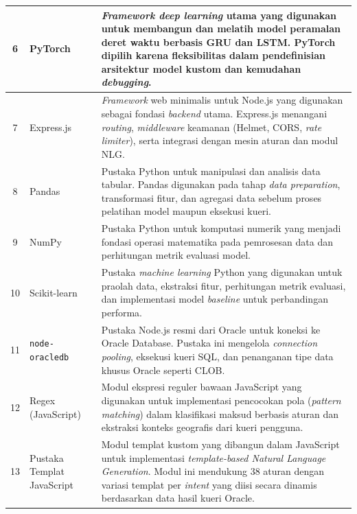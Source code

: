 \begin{longtable}{|c|p{2.5cm}|p{9cm}|}
6 & PyTorch & \textit{Framework deep learning} utama yang digunakan untuk membangun dan melatih model peramalan deret waktu berbasis GRU dan LSTM. PyTorch dipilih karena fleksibilitas dalam pendefinisian arsitektur model kustom dan kemudahan \textit{debugging}. \\
\hline

7 & Express.js & \textit{Framework} web minimalis untuk Node.js yang digunakan sebagai fondasi \textit{backend} utama. Express.js menangani \textit{routing}, \textit{middleware} keamanan (Helmet, CORS, \textit{rate limiter}), serta integrasi dengan mesin aturan dan modul NLG. \\
\hline

8 & Pandas & Pustaka Python untuk manipulasi dan analisis data tabular. Pandas digunakan pada tahap \textit{data preparation}, transformasi fitur, dan agregasi data sebelum proses pelatihan model maupun eksekusi kueri. \\
\hline

9 & NumPy & Pustaka Python untuk komputasi numerik yang menjadi fondasi operasi matematika pada pemrosesan data dan perhitungan metrik evaluasi model. \\
\hline

10 & Scikit-learn & Pustaka \textit{machine learning} Python yang digunakan untuk praolah data, ekstraksi fitur, perhitungan metrik evaluasi, dan implementasi model \textit{baseline} untuk perbandingan performa. \\
\hline

11 & \texttt{node-}\newline\texttt{oracledb} & Pustaka Node.js resmi dari Oracle untuk koneksi ke Oracle Database. Pustaka ini mengelola \textit{connection pooling}, eksekusi kueri SQL, dan penanganan tipe data khusus Oracle seperti CLOB. \\
\hline

12 & Regex (JavaScript) & Modul ekspresi reguler bawaan JavaScript yang digunakan untuk implementasi pencocokan pola (\textit{pattern matching}) dalam klasifikasi maksud berbasis aturan dan ekstraksi konteks geografis dari kueri pengguna. \\
\hline

13 & Pustaka Templat JavaScript & Modul templat kustom yang dibangun dalam JavaScript untuk implementasi \textit{template-based Natural Language Generation}. Modul ini mendukung 38 aturan dengan variasi templat per \textit{intent} yang diisi secara dinamis berdasarkan data hasil kueri Oracle. \\
\hline


\end{longtable}
